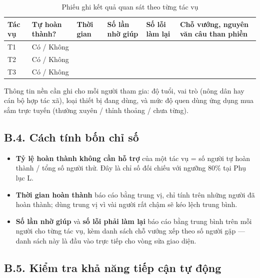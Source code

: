 \begingroup
\tblsetup\renewcommand{\arraystretch}{1.6}
\begin{table}[H]
\centering
\small
\caption{Phiếu ghi kết quả quan sát theo từng tác vụ}
\label{tab:phieu-quansat}
\begin{tabular}{L{1.13cm} L{2.26cm} L{1.95cm} L{2.05cm} L{2.05cm} L{4.40cm}}
\toprule
{}
\textbf{Tác vụ} & \textbf{Tự hoàn thành?} & \textbf{Thời gian} & \textbf{Số lần nhờ giúp} & \textbf{Số lỗi làm lại} & \textbf{Chỗ vướng, nguyên văn câu than phiền} \\
\midrule
T1 & Có / Không & \hrulefill & \hrulefill & \hrulefill & \hrulefill \\
T2 & Có / Không & \hrulefill & \hrulefill & \hrulefill & \hrulefill \\
T3 & Có / Không & \hrulefill & \hrulefill & \hrulefill & \hrulefill \\
\bottomrule
\end{tabular}
\end{table}
\endgroup

\noindent Thông tin nền cần ghi cho mỗi người tham gia: độ tuổi, vai trò (nông
dân hay cán bộ hợp tác xã), loại thiết bị đang dùng, và mức độ quen dùng ứng
dụng mua sắm trực tuyến (thường xuyên / thỉnh thoảng / chưa từng).

\subsection*{B.4. Cách tính bốn chỉ số}

\begin{itemize}
    \item \textbf{Tỷ lệ hoàn thành không cần hỗ trợ} của một tác vụ = số người tự
    hoàn thành / tổng số người thử. Đây là chỉ số đối chiếu với ngưỡng 80\% tại
    Phụ lục L.
    \item \textbf{Thời gian hoàn thành} báo cáo bằng trung vị, chỉ tính trên những
    người đã hoàn thành; dùng trung vị vì vài người rất chậm sẽ kéo lệch trung
    bình.
    \item \textbf{Số lần nhờ giúp} và \textbf{số lỗi phải làm lại} báo cáo bằng
    trung bình trên mỗi người cho từng tác vụ, kèm danh sách chỗ vướng xếp theo
    số người gặp --- danh sách này là đầu vào trực tiếp cho vòng sửa giao diện.
\end{itemize}

\subsection*{B.5. Kiểm tra khả năng tiếp cận tự động}


